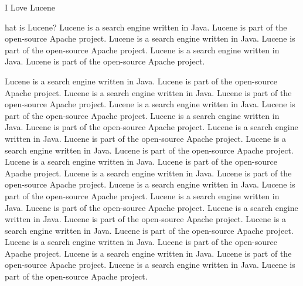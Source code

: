 \documentclass[11pt]{book}
\begin{document}
\newcommand{\firstchar}[1]{\noindent{\huge\bf #1}}




\clearpage
\pagestyle{empty}
\cleardoublepage
\vspace*{2.375in}
\begin{center}
{\hfill {\Huge I Love Lucene}}
\end{center}




%
\setcounter{page}{1}%
%
\pagestyle{fancy}%

\firstchar{W}hat is Lucene?
Lucene is a search engine written in Java.  Lucene is part of the
open-source Apache project.
Lucene is a search engine written in Java.  Lucene is part of the
open-source Apache project.
Lucene is a search engine written in Java.  Lucene is part of the
open-source Apache project.


\noindent
Lucene is a search engine written in Java.  Lucene is part of the
open-source Apache project.
Lucene is a search engine written in Java.  Lucene is part of the
open-source Apache project.
Lucene is a search engine written in Java.  Lucene is part of the
open-source Apache project.
Lucene is a search engine written in Java.  Lucene is part of the
open-source Apache project.
Lucene is a search engine written in Java.  Lucene is part of the
open-source Apache project.
Lucene is a search engine written in Java.  Lucene is part of the
open-source Apache project.
Lucene is a search engine written in Java.  Lucene is part of the
open-source Apache project.
Lucene is a search engine written in Java.  Lucene is part of the
open-source Apache project.
Lucene is a search engine written in Java.  Lucene is part of the
open-source Apache project.
Lucene is a search engine written in Java.  Lucene is part of the
open-source Apache project.
Lucene is a search engine written in Java.  Lucene is part of the
open-source Apache project.
Lucene is a search engine written in Java.  Lucene is part of the
open-source Apache project.
Lucene is a search engine written in Java.  Lucene is part of the
open-source Apache project.
Lucene is a search engine written in Java.  Lucene is part of the
open-source Apache project.
Lucene is a search engine written in Java.  Lucene is part of the
open-source Apache project.
\end{document}

